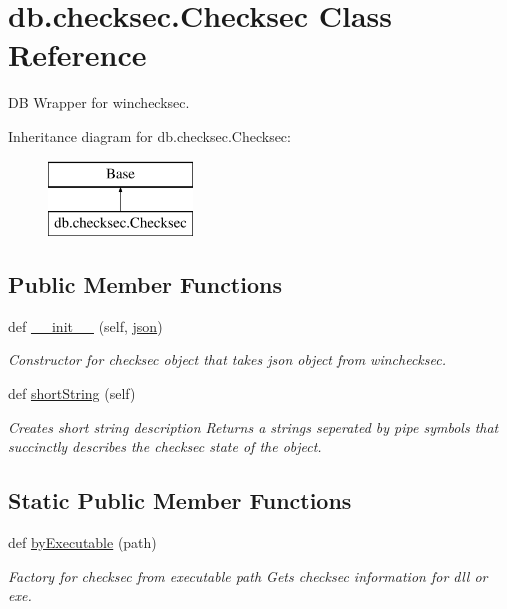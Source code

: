 \hypertarget{classdb_1_1checksec_1_1_checksec}{}\section{db.\+checksec.\+Checksec Class Reference}
\label{classdb_1_1checksec_1_1_checksec}


DB Wrapper for winchecksec.  


Inheritance diagram for db.\+checksec.\+Checksec\+:\begin{figure}[H]
\begin{center}
\leavevmode
\includegraphics[height=2.000000cm]{d0/d14/classdb_1_1checksec_1_1_checksec}
\end{center}
\end{figure}
\subsection*{Public Member Functions}
\begin{DoxyCompactItemize}
\item 
def \mbox{\hyperlink{classdb_1_1checksec_1_1_checksec_aa5dd874112352d0e95d376d619cc7417}{\+\_\+\+\_\+init\+\_\+\+\_\+}} (self, \mbox{\hyperlink{classnlohmann_1_1basic__json}{json}})
\begin{DoxyCompactList}\small\item\em Constructor for checksec object that takes json object from winchecksec. \end{DoxyCompactList}\item 
def \mbox{\hyperlink{classdb_1_1checksec_1_1_checksec_aac7a0cd7ad46ba754f4773555da84fd3}{short\+String}} (self)
\begin{DoxyCompactList}\small\item\em Creates short string description Returns a strings seperated by pipe symbols that succinctly describes the checksec state of the object. \end{DoxyCompactList}\end{DoxyCompactItemize}
\subsection*{Static Public Member Functions}
\begin{DoxyCompactItemize}
\item 
def \mbox{\hyperlink{classdb_1_1checksec_1_1_checksec_a25d2a8573c852b4610dda6899f60932e}{by\+Executable}} (path)
\begin{DoxyCompactList}\small\item\em Factory for checksec from executable path Gets checksec information for dll or exe. \end{DoxyCompactList}\end{DoxyCompactItemize}
